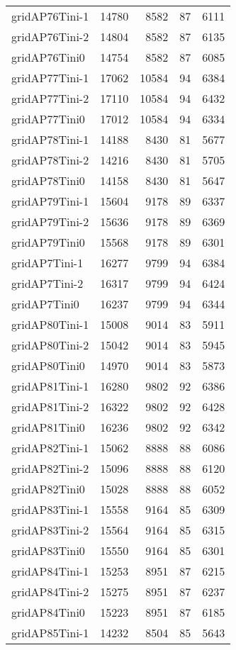 \begin{longtable}{lrrrr}
gridAP76Tini-1 & 14780 & 8582 & 87 & 6111 \\
gridAP76Tini-2 & 14804 & 8582 & 87 & 6135 \\
gridAP76Tini0 & 14754 & 8582 & 87 & 6085 \\
gridAP77Tini-1 & 17062 & 10584 & 94 & 6384 \\
gridAP77Tini-2 & 17110 & 10584 & 94 & 6432 \\
gridAP77Tini0 & 17012 & 10584 & 94 & 6334 \\
gridAP78Tini-1 & 14188 & 8430 & 81 & 5677 \\
gridAP78Tini-2 & 14216 & 8430 & 81 & 5705 \\
gridAP78Tini0 & 14158 & 8430 & 81 & 5647 \\
gridAP79Tini-1 & 15604 & 9178 & 89 & 6337 \\
gridAP79Tini-2 & 15636 & 9178 & 89 & 6369 \\
gridAP79Tini0 & 15568 & 9178 & 89 & 6301 \\
gridAP7Tini-1 & 16277 & 9799 & 94 & 6384 \\
gridAP7Tini-2 & 16317 & 9799 & 94 & 6424 \\
gridAP7Tini0 & 16237 & 9799 & 94 & 6344 \\
gridAP80Tini-1 & 15008 & 9014 & 83 & 5911 \\
gridAP80Tini-2 & 15042 & 9014 & 83 & 5945 \\
gridAP80Tini0 & 14970 & 9014 & 83 & 5873 \\
gridAP81Tini-1 & 16280 & 9802 & 92 & 6386 \\
gridAP81Tini-2 & 16322 & 9802 & 92 & 6428 \\
gridAP81Tini0 & 16236 & 9802 & 92 & 6342 \\
gridAP82Tini-1 & 15062 & 8888 & 88 & 6086 \\
gridAP82Tini-2 & 15096 & 8888 & 88 & 6120 \\
gridAP82Tini0 & 15028 & 8888 & 88 & 6052 \\
gridAP83Tini-1 & 15558 & 9164 & 85 & 6309 \\
gridAP83Tini-2 & 15564 & 9164 & 85 & 6315 \\
gridAP83Tini0 & 15550 & 9164 & 85 & 6301 \\
gridAP84Tini-1 & 15253 & 8951 & 87 & 6215 \\
gridAP84Tini-2 & 15275 & 8951 & 87 & 6237 \\
gridAP84Tini0 & 15223 & 8951 & 87 & 6185 \\
gridAP85Tini-1 & 14232 & 8504 & 85 & 5643 \\

\end{longtable}
